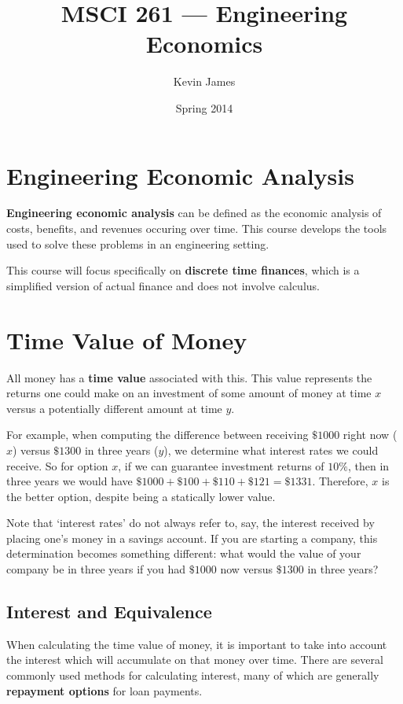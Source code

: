 \documentclass[12pt]{article}
\begin{document}
\title{MSCI 261 --- Engineering Economics}
\author{Kevin James}
\date{\vspace{-2ex}Spring 2014}
\maketitle\HRule

\section{Engineering Economic Analysis}
{\bf Engineering economic analysis} can be defined as the economic analysis of costs, benefits, and revenues occuring over time. This course develops the tools used to solve these problems in an engineering setting.

This course will focus specifically on {\bf discrete time finances}, which is a simplified version of actual finance and does not involve calculus.

\section{Time Value of Money}
All money has a {\bf time value} associated with this. This value represents the returns one could make on an investment of some amount of money at time $x$ versus a potentially different amount at time $y$.

For example, when computing the difference between receiving $\$1000$ right now ($x$) versus $\$1300$ in three years ($y$), we determine what interest rates we could receive. So for option $x$, if we can guarantee investment returns of $10\%$, then in three years we would have $\$1000 + \$100 + \$110 + \$121 = \$1331$. Therefore, $x$ is the better option, despite being a statically lower value.

Note that `interest rates' do not always refer to, say, the interest received by placing one's money in a savings account. If you are starting a company, this determination becomes something different: what would the value of your company be in three years if you had $\$1000$ now versus $\$1300$ in three years?

\subsection{Interest and Equivalence}
When calculating the time value of money, it is important to take into account the interest which will accumulate on that money over time. There are several commonly used methods for calculating interest, many of which are generally {\bf repayment options} for loan payments.
\end{document}
